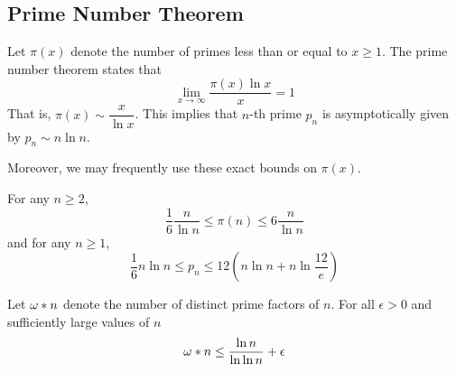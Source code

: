\subsection{Prime Number Theorem}
\begin{theorem}\label{thm:pnt}
	Let \(\pi(x)\) denote the number of primes less than or equal to \(x \geq 1\). The prime number theorem states that 
	\begin{equation}
		\lim_{x \to \infty} \dfrac{\pi(x) \ln x}{x} = 1
	\end{equation}
	That is, \(\pi(x) \sim \dfrac{x}{\ln x}\). This implies that \(n\)-th prime \(p_n\) is asymptotically given by \(p_n \sim n \ln n\).
\end{theorem}

Moreover, we may frequently use these exact bounds on \(\pi(x)\).
\begin{theorem}\label{thm:ineqpnt}
	For any \(n \geq 2\), 
	\begin{equation}
		\dfrac{1}{6} \dfrac{n}{\ln n} \leq \pi(n) \leq 6 \dfrac{n}{\ln n}
	\end{equation}
	and for any \(n \geq 1\),
	\begin{equation}
		\dfrac{1}{6} n \ln n \leq p_n \leq 12 (n \ln n + n \ln \frac{12}{e})
	\end{equation}
\end{theorem}

\begin{theorem}\label{thm:uniqueprimeorder}
	Let \(\func{\omega}{n}\) denote the number of distinct prime factors of \(n\).  For all \(\epsilon > 0\) and sufficiently large values of \(n\)
\begin{equation}
	\func{\omega}{n}  \leq \dfrac{\ln n}{\ln \ln n} + \epsilon
\end{equation}
\end{theorem}

